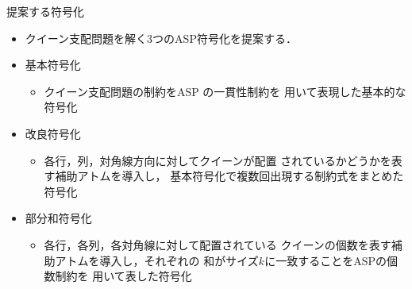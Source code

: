 \documentclass[dvipdfmx,10pt]{beamer}
\begin{document}
%
%

\begin{frame}{提案する符号化}
 \begin{itemize}
  \item クイーン支配問題を解く3つのASP符号化を提案する．
 \end{itemize}
 \begin{itemize}
  \item \alert{基本符号化}
	\begin{itemize}
	 \item クイーン支配問題の制約をASP の一貫性制約を
	       用いて表現した基本的な符号化
	\end{itemize}
  \item \alert{改良符号化} 
	\begin{itemize}
	 \item 各行，列，対角線方向に対してクイーンが配置
	       されているかどうかを表す補助アトムを導入し，
	       基本符号化で複数回出現する制約式をまとめた符号化
	\end{itemize}
  \item \alert{部分和符号化}
	\begin{itemize}
	 \item 各行，各列，各対角線に対して配置されている
	       クイーンの個数を表す補助アトムを導入し，それぞれの
	       和がサイズ$k$に一致することをASPの個数制約を
	       用いて表した符号化
	\end{itemize}
 \end{itemize}
\end{frame}

%
%
 
\end{document}
